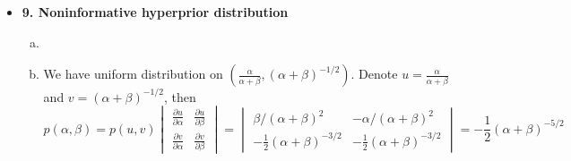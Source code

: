 \documentclass{article}
\begin{document}
\begin{itemize}
\begin{enumerate}[(a)]
    \end{enumerate}


\item \textbf{9. Noninformative hyperprior distribution}
  \begin{enumerate}[(a)]
    \item
    \item We have uniform distribution on $\left(\frac{\alpha}{\alpha+\beta}, (\alpha+\beta)^{-1/2} \right)$. Denote $u = \frac{\alpha}{\alpha+\beta}$ and $v=(\alpha+\beta)^{-1/2}$, then
      $$
      p(\alpha, \beta) = p(u,v) \begin{vmatrix}
        \frac{\partial u}{\partial \alpha} &  \frac{\partial u}{\partial \beta} \\
        \frac{\partial v}{\partial \alpha} &  \frac{\partial v}{\partial \beta} 
      \end{vmatrix} = \begin{vmatrix} \beta/(\alpha+\beta)^2 & -\alpha/(\alpha+\beta)^2 \\
        -\frac{1}{2}(\alpha+\beta)^{-3/2} & -\frac{1}{2}(\alpha+\beta)^{-3/2}  \end{vmatrix} = -\frac{1}{2}(\alpha+\beta)^{-5/2}
      $$
    \end{enumerate}

\end{itemize}
\end{document}
